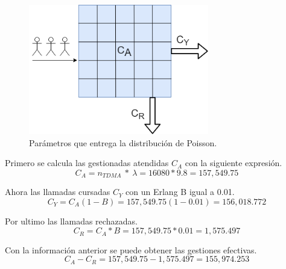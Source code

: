 \documentclass[11pt,letterpaper]{article}
\begin{document}
\begin{figure}[ht]
    \centering
    \includegraphics[width=0.7\textwidth]{imagenes/pos.png}
    \caption{Parámetros que entrega la distribución de Poisson.}
\end{figure}

Primero se calcula las gestionadas atendidas $C_{A}$ con la siguiente expresión.
\begin{equation}
    C_A=n_{TDMA} \ * \ \lambda = 16080 * 9.8= 157,549.75
\end{equation}

Ahora las llamadas cursadas $C_Y$ con un Erlang B igual a 0.01.
\begin{equation}
    C_Y=C_A(1-B)=157,549.75(1-0.01)=156,018.772
\end{equation}

Por ultimo las llamadas rechazadas.
\begin{equation}
    C_R=C_A*B=157,549.75*0.01=1,575.497
\end{equation}

Con la información anterior se puede obtener las gestiones efectivas.
\begin{equation}
    C_A-C_R=157,549.75-1,575.497=155,974.253
\end{equation}
\end{document}
